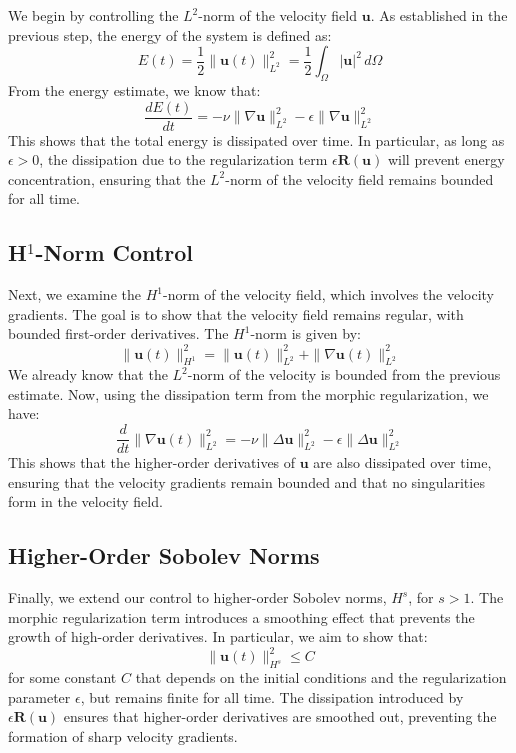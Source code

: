 \documentclass{article}
\begin{document}
We begin by controlling the \( L^2 \)-norm of the velocity field \( \mathbf{u} \). As established in the previous step, the energy of the system is defined as:
\[
E(t) = \frac{1}{2} \|\mathbf{u}(t)\|_{L^2}^2 = \frac{1}{2} \int_{\Omega} |\mathbf{u}|^2 \, d\Omega
\]
From the energy estimate, we know that:
\[
\frac{dE(t)}{dt} = -\nu \|\nabla \mathbf{u}\|_{L^2}^2 - \epsilon \|\nabla \mathbf{u}\|_{L^2}^2
\]
This shows that the total energy is dissipated over time. In particular, as long as \( \epsilon > 0 \), the dissipation due to the regularization term \( \epsilon \mathbf{R}(\mathbf{u}) \) will prevent energy concentration, ensuring that the \( L^2 \)-norm of the velocity field remains bounded for all time.

\subsection*{H\(^1\)-Norm Control}

Next, we examine the \( H^1 \)-norm of the velocity field, which involves the velocity gradients. The goal is to show that the velocity field remains regular, with bounded first-order derivatives. The \( H^1 \)-norm is given by:
\[
\|\mathbf{u}(t)\|_{H^1}^2 = \|\mathbf{u}(t)\|_{L^2}^2 + \|\nabla \mathbf{u}(t)\|_{L^2}^2
\]
We already know that the \( L^2 \)-norm of the velocity is bounded from the previous estimate. Now, using the dissipation term from the morphic regularization, we have:
\[
\frac{d}{dt} \|\nabla \mathbf{u}(t)\|_{L^2}^2 = -\nu \|\Delta \mathbf{u}\|_{L^2}^2 - \epsilon \|\Delta \mathbf{u}\|_{L^2}^2
\]
This shows that the higher-order derivatives of \( \mathbf{u} \) are also dissipated over time, ensuring that the velocity gradients remain bounded and that no singularities form in the velocity field.

\subsection*{Higher-Order Sobolev Norms}

Finally, we extend our control to higher-order Sobolev norms, \( H^s \), for \( s > 1 \). The morphic regularization term introduces a smoothing effect that prevents the growth of high-order derivatives. In particular, we aim to show that:
\[
\|\mathbf{u}(t)\|_{H^s}^2 \leq C
\]
for some constant \( C \) that depends on the initial conditions and the regularization parameter \( \epsilon \), but remains finite for all time. The dissipation introduced by \( \epsilon \mathbf{R}(\mathbf{u}) \) ensures that higher-order derivatives are smoothed out, preventing the formation of sharp velocity gradients.
\end{document}
